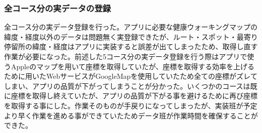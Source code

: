 ﻿\subsubsection{全コース分の実データの登録}
全コース分の実データ登録を行った。アプリに必要な健康ウォーキングマップの緯度・経度以外のデータは問題無く実登録できたが、ルート・スポット・最寄り停留所の緯度・経度はアプリに実装すると誤差が出てしまったため、取得し直す作業が必要になった。前述した5コース分の実データ登録を行う際はアプリで使うAppleのマップを用いて座標を取得していたが、座標を取得する効率を上げるために用いたWebサービスがGoogleMapを使用していたため全ての座標がズレてしまい、アプリの品質が下がってしまうことが分かった。いくつかのコースは既に座標を取得し終えていたが、アプリの品質が下がる事を避けるために再び座標を取得する事にした。作業そのものが手戻りになってしまったが、実装班が予定より早く作業を進める事ができていたためデータ班が作業時間を確保することができた。

